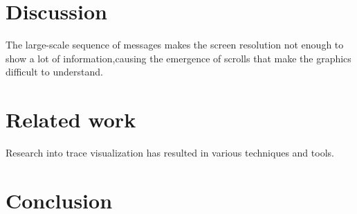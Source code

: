 \documentclass{sig-alternate}
\newcommand{\seclabel}[1]{\label{sec:#1}}
\begin{document}
\section{Discussion}\seclabel{discussion}

The large-scale sequence of messages makes the screen resolution not enough to show a lot of information,causing the emergence of scrolls that make the graphics difficult to understand. 



\section{Related work}\seclabel{relatedwork}

Research into trace visualization has resulted in various techniques and tools.

\section{Conclusion}\seclabel{conclusion}




\end{document}
